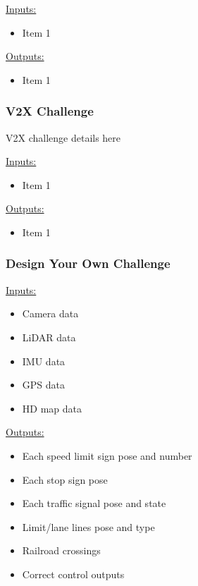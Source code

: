 \documentclass[12pt]{article}
\begin{document}
\underline{Inputs:}
\begin{itemize}
    \item Item 1
\end{itemize}
\underline{Outputs:}
\begin{itemize}
    \item Item 1
\end{itemize}

\subsubsection{V2X Challenge}
V2X challenge details here

\underline{Inputs:}
\begin{itemize}
    \item Item 1
\end{itemize}
\underline{Outputs:}
\begin{itemize}
    \item Item 1
\end{itemize}

\subsubsection{Design Your Own Challenge}
\underline{Inputs:}
\begin{itemize}
    \item Camera data
    \item LiDAR data
    \item IMU data
    \item GPS data
    \item HD map data
\end{itemize}
\underline{Outputs:}
\begin{itemize}
    \item Each speed limit sign pose and number
    \item Each stop sign pose
    \item Each traffic signal pose and state
    \item Limit/lane lines pose and type
    \item Railroad crossings
    \item Correct control outputs
\end{itemize}
\end{document}
